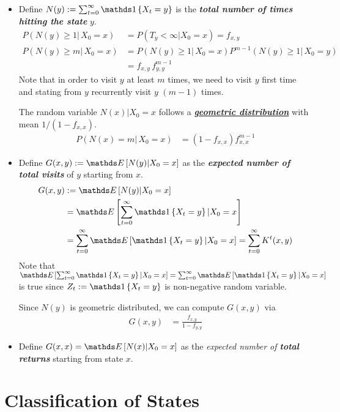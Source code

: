 \documentclass[11pt]{article}
\begin{document}
\begin{itemize}
\item Define $N(y):= \sum_{t=0}^{\infty}\ind{X_{t} = y}$ is the \emph{\textbf{total number of times hitting the state}} $y$.
\begin{align}
P(N(y) \ge 1 |\, X_{0} = x) &= P(T_{y} < \infty | X_{0} = x) = f_{x,y} \label{eqn: mc_hit_times} \\
P(N(y) \ge m |\, X_{0} = x) &= P(N(y) \ge 1 |\, X_{0} = x)P^{m-1}(N(y) \ge 1 |\, X_{0} = y) \label{eqn: mc_hit_times_hitting_time_recusion} \\
&=f_{x,y}\, f^{m-1}_{y,y}\nonumber
\end{align} Note that in order to visit $y$ at least $m$ times, we need to visit $y$ first time and stating from $y$ recurrently visit $y$ $(m-1)$ times.

The random variable $N(x)|X_0 = x$ follows a \underline{\textbf{\emph{geometric distribution}}} with mean $1/(1- f_{x,x})$.
\begin{align}
P(N(x) = m |\, X_{0} = x) &= (1- f_{x,x})f^{m-1}_{x,x} \label{eqn: mc_hit_times_m_times_recurrent}
\end{align}

\item Define $G(x, y) := \E{}{N(y) | X_{0} = x}$ as the \emph{\textbf{expected number of \textbf{total visits}}} of $y$ starting from $x$.
\begin{align}
G(x, y) &:= \E{}{N(y) | X_{0} = x} \nonumber\\
&=\E{}{\sum_{t=0}^{\infty}\ind{X_{t} = y} | X_{0} = x}  \nonumber\\
&= \sum_{t=0}^{\infty}\E{}{\ind{X_{t} = y}| X_{0} = x} =\sum_{t=0}^{\infty}K^{t}(x, y) \label{eqn: mc_expect_hit_times}
\end{align} Note that $\E{}{\sum_{t=0}^{\infty}\ind{X_{t} = y} | X_{0} = x} = \sum_{t=0}^{\infty}\E{}{\ind{X_{t} = y}| X_{0} = x}$ is true since $Z_{t} := \ind{X_{t} = y}$ is non-negative random variable.

Since $N(y)$ is geometric distributed, we can compute $G(x, y)$ via 
\begin{align}
G(x, y) &= \frac{f_{x,y}}{1- f_{y,y}} \label{eqn: mc_expect_hit_times_2}
\end{align}

\item Define $G(x,x) = \E{}{N(x) | X_{0} = x}$ as the \emph{expected number of \textbf{total returns}} starting from state $x$.
\end{itemize}


\section{Classification of States}
\end{document}

